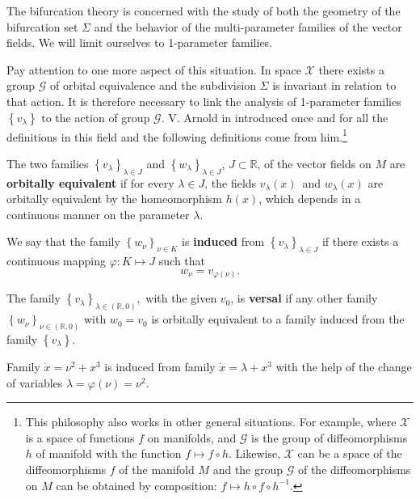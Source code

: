 The bifurcation theory is concerned with the study of both the geometry of the bifurcation set $\Sigma$ and the behavior of the multi-parameter families of the vector fields. We will limit ourselves to 1-parameter families.

Pay attention to one more aspect of this situation. In space $\mathcal{X}$ there exists a group $\mathcal{G}$ of orbital equivalence and the subdivision $\Sigma$ is invariant in relation to that action. It is therefore necessary to link the analysis of 1-parameter families $\left\{ v_{\lambda }\right\} $ to the action of group $\mathcal{G}$. V. Arnold in \cite{Ar2} introduced once and for all the definitions in this field and the following definitions come from him.\footnote{This philosophy also works in other general situations. For example, where $\mathcal{X}$ is a space of functions $f$ on manifolds, and $\mathcal{G}$ is the group of diffeomorphisms $h$ of manifold with the function $f\longmapsto f\circ h.$ Likewise, $\mathcal{X}$ can be a space of the diffeomorphisms $f$ of the manifold $M$ and the group $\mathcal{G}$ of the diffeomorphisms on $M$ can be obtained by composition: $f\longmapsto h\circ f\circ h^{-1}$.}

\begin{definition}
	The two families $\left\{ v_{\lambda }\right\} _{\lambda
	\in J}$ and $\left\{ w_{\lambda }\right\} _{\lambda \in J}$, $J\subset \mathbb{R}$, of the vector fields on $M$ are \textbf{orbitally equivalent} if for every $\lambda \in J$, the fields $v_{\lambda }(x)$\ and $w_{\lambda }(x)$ are orbitally equivalent by the homeomorphism $h (x)$, which depends in a continuous manner on the parameter $\lambda$.
	
	We say that the family $\left\{ w_{\nu }\right\} _{\nu \in K}$ is \textbf{induced} from $\left\{ v_{\lambda }\right\} _{\lambda \in J}$ if there exists a continuous mapping $\varphi :K\longmapsto J$ such that
	$$
	w_{\nu }=v_{\varphi (\nu )}.
	$$
	
	The family $\left\{ v_{\lambda }\right\} _{\lambda \in \left( \mathbb{R}%
	,0\right) },$ with the given $v_{0}$, is \textbf{versal} if any other family $\left\{ w_{\nu }\right\} _{\nu \in \left( \mathbb{R}%
	,0\right) }$ with $w_{0}=v_{0}$ is orbitally equivalent to a family induced from the family $\left\{ v_{\lambda }\right\} .$
\end{definition}

\begin{example}
	Family $\dot{x}=\nu ^{2}+x^{3}$ is induced from family $\dot{x}=\lambda +x^{3}$ with the help of the change of variables $\lambda
	=\varphi (\nu )=\nu ^{2}.$
\end{example}

